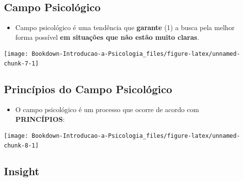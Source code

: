 \documentclass[
]{book}
\providecommand{\tightlist}{%
  \setlength{\itemsep}{0pt}\setlength{\parskip}{0pt}}
\begin{document}
\hypertarget{campo-psicoluxf3gico}{%
\subsection{Campo Psicológico}\label{campo-psicoluxf3gico}}

\begin{itemize}
\tightlist
\item
  Campo psicológico é uma tendência que \textbf{garante} (1) a busca pela melhor forma possível \textbf{em situações que não estão muito claras}.
\end{itemize}

\texttt{[image: Bookdown-Introducao-a-Psicologia\_files/figure-latex/unnamed-chunk-7-1]}

\hypertarget{princuxedpios-do-campo-psicoluxf3gico}{%
\subsection{Princípios do Campo Psicológico}\label{princuxedpios-do-campo-psicoluxf3gico}}

\begin{itemize}
\tightlist
\item
  O campo psicológico é um processo que ocorre de acordo com \textbf{PRINCÍPIOS}:
\end{itemize}

\texttt{[image: Bookdown-Introducao-a-Psicologia\_files/figure-latex/unnamed-chunk-8-1]}

\hypertarget{insight}{%
\subsection{Insight}\label{insight}}
\end{document}
